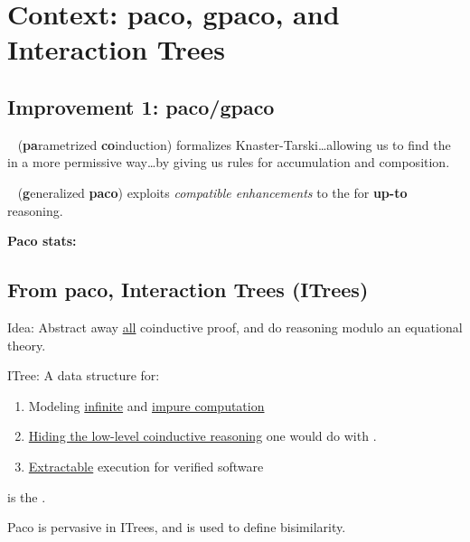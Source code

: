 \section{Context: paco, gpaco, and Interaction Trees}
\label{sec:paco}

\subsection{Improvement 1: paco/gpaco}

~\cite{paco} (\textbf{pa}rametrized \textbf{co}induction) formalizes
Knaster-Tarski\ldots allowing us to find the  in a more permissive
way\ldots by giving us rules for accumulation and composition.


~\cite{gpaco} (\textbf{g}eneralized \textbf{paco}) exploits \emph{compatible
enhancements} to the  for \textbf{up-to} reasoning.

\textbf{Paco stats:} 

\subsection{From paco, Interaction Trees (ITrees)~\cite{itrees}}

Idea: Abstract away \underline{all} coinductive proof, and do reasoning modulo an
equational theory.

ITree: A data structure for:
\begin{enumerate}
  \item Modeling \underline{infinite} and \underline{impure computation}
  \item \underline{Hiding the low-level coinductive reasoning} one would do with
        .
  \item \underline{Extractable} execution for verified software
\end{enumerate}

 is the .

Paco is pervasive in ITrees, and is used to define bisimilarity.

